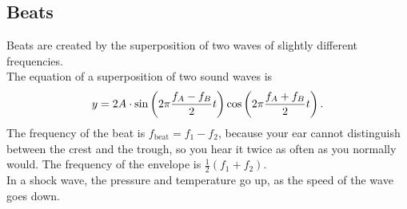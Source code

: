 \documentclass[class=article, crop=false]{standalone}
\begin{document}
  \subsection{Beats}
  Beats are created by the superposition of two waves of slightly different frequencies.\\[10pt]
  The equation of a superposition of two sound waves is 
  \[
    y = 2A \cdot \sin \left( 2\pi \frac{f_A - f_B}{2}t \right)\cos \left( 2\pi \frac{f_A + f_B}{2}t \right).
  \]
  The frequency of the beat is $f_{\text{beat}} = f_1 - f_2$, because your ear cannot distinguish between the crest and the trough, so you hear it twice as often as you normally would. The frequency of the envelope is $\frac{1}{2}(f_1+f_2)$. \\[10pt]
  In a shock wave, the pressure and temperature go up, as the speed of the wave goes down.
\end{document}
